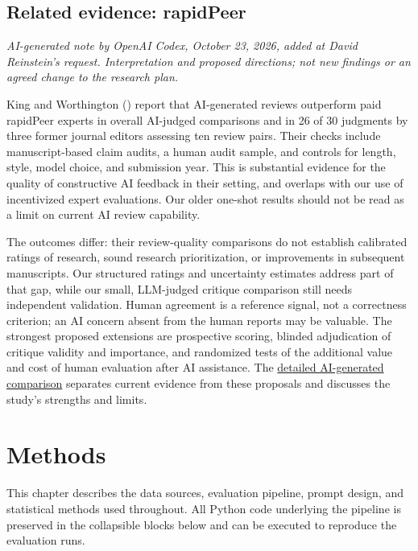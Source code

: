\documentclass[
  11pt,
  letterpaper,
]{article}
\begin{document}
\subsection{Related evidence: rapidPeer}\label{sec-peerless}

\emph{AI-generated note by OpenAI Codex, October 23, 2026, added at
David Reinstein's request. Interpretation and proposed directions; not
new findings or an agreed change to the research plan.}

King and Worthington ()
report that AI-generated reviews outperform paid rapidPeer experts in
overall AI-judged comparisons and in 26 of 30 judgments by three former
journal editors assessing ten review pairs. Their checks include
manuscript-based claim audits, a human audit sample, and controls for
length, style, model choice, and submission year. This is substantial
evidence for the quality of constructive AI feedback in their setting,
and overlaps with our use of incentivized expert evaluations. Our older
one-shot results should not be read as a limit on current AI review
capability.

The outcomes differ: their review-quality comparisons do not establish
calibrated ratings of research, sound research prioritization, or
improvements in subsequent manuscripts. Our structured ratings and
uncertainty estimates address part of that gap, while our small,
LLM-judged critique comparison still needs independent validation. Human
agreement is a reference signal, not a correctness criterion; an AI
concern absent from the human reports may be valuable. The strongest
proposed extensions are prospective scoring, blinded adjudication of
critique validity and importance, and randomized tests of the additional
value and cost of human evaluation after AI assistance. The
\hyperref[sec-peerless-context]{detailed AI-generated comparison}
separates current evidence from these proposals and discusses the
study's strengths and limits.


\section{Methods}\label{methods}

\small

This chapter describes the data sources, evaluation pipeline, prompt
design, and statistical methods used throughout. All Python code
underlying the pipeline is preserved in the collapsible blocks below and
can be executed to reproduce the evaluation runs.
\end{document}
